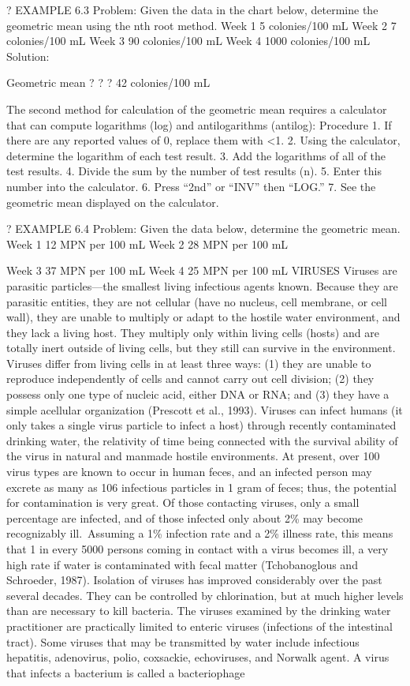 \documentclass{article}
\begin{document}
? EXAMPLE 6.3 Problem: Given the data in the chart below, determine the
geometric mean using the nth root method. Week 1 5 colonies/100 mL Week
2 7 colonies/100 mL Week 3 90 colonies/100 mL Week 4 1000 colonies/100
mL Solution:

Geometric mean ? ? ? 42 colonies/100 mL

The second method for calculation of the geometric mean requires a
calculator that can compute logarithms (log) and antilogarithms
(antilog): Procedure 1. If there are any reported values of 0, replace
them with \textless1. 2. Using the calculator, determine the logarithm
of each test result. 3. Add the logarithms of all of the test results.
4. Divide the sum by the number of test results (n). 5. Enter this
number into the calculator. 6. Press ``2nd'' or ``INV'' then ``LOG.'' 7.
See the geometric mean displayed on the calculator.

? EXAMPLE 6.4 Problem: Given the data below, determine the geometric
mean. Week 1 12 MPN per 100 mL Week 2 28 MPN per 100 mL

Week 3 37 MPN per 100 mL Week 4 25 MPN per 100 mL VIRUSES Viruses are
parasitic particles---the smallest living infectious agents known.
Because they are parasitic entities, they are not cellular (have no
nucleus, cell membrane, or cell wall), they are unable to multiply or
adapt to the hostile water environment, and they lack a living host.
They multiply only within living cells (hosts) and are totally inert
outside of living cells, but they still can survive in the environment.
Viruses differ from living cells in at least three ways: (1) they are
unable to reproduce independently of cells and cannot carry out cell
division; (2) they possess only one type of nucleic acid, either DNA or
RNA; and (3) they have a simple acellular organization (Prescott et al.,
1993). Viruses can infect humans (it only takes a single virus particle
to infect a host) through recently contaminated drinking water, the
relativity of time being connected with the survival ability of the
virus in natural and manmade hostile environments. At present, over 100
virus types are known to occur in human feces, and an infected person
may excrete as many as 106 infectious particles in 1 gram of feces;
thus, the potential for contamination is very great. Of those contacting
viruses, only a small percentage are infected, and of those infected
only about 2\% may become recognizably ill.~Assuming a 1\% infection
rate and a 2\% illness rate, this means that 1 in every 5000 persons
coming in contact with a virus becomes ill, a very high rate if water is
contaminated with fecal matter (Tchobanoglous and Schroeder, 1987).
Isolation of viruses has improved considerably over the past several
decades. They can be controlled by chlorination, but at much higher
levels than are necessary to kill bacteria. The viruses examined by the
drinking water practitioner are practically limited to enteric viruses
(infections of the intestinal tract). Some viruses that may be
transmitted by water include infectious hepatitis, adenovirus, polio,
coxsackie, echoviruses, and Norwalk agent. A virus that infects a
bacterium is called a bacteriophage
\end{document}
